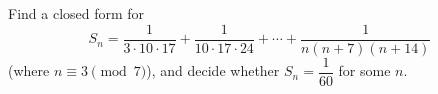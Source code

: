 Find a closed form for
\[S_n=\dfrac{1}{3\cdot10\cdot17}+\dfrac{1}{10\cdot17\cdot24}+\cdots+\dfrac{1}{n(n+7)(n+14)}\]
(where $n\equiv3\pmod7$), and decide whether $S_n=\dfrac1{60}$ for some $n$.

